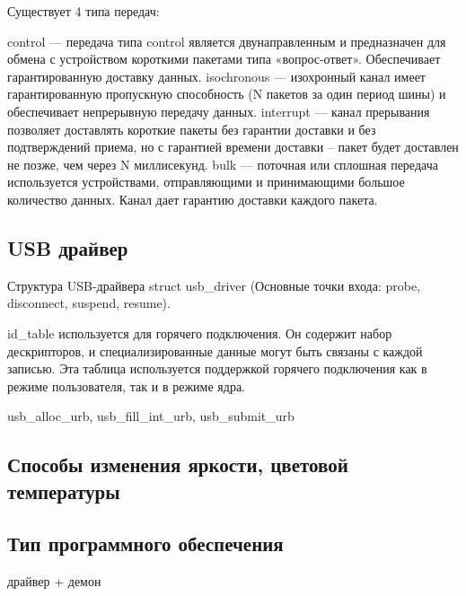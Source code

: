 Существует 4 типа передач:

control — передача типа control является двунаправленным и предназначен для обмена с устройством короткими пакетами типа «вопрос-ответ». Обеспечивает гарантированную доставку данных.
isochronous — изохронный канал имеет гарантированную пропускную способность (N пакетов за один период шины) и обеспечивает непрерывную передачу данных.
interrupt — канал прерывания позволяет доставлять короткие пакеты без гарантии доставки и без подтверждений приема, но с гарантией времени доставки – пакет будет доставлен не позже, чем через N миллисекунд.
bulk — поточная или сплошная передача используется устройствами, отправляющими и принимающими большое количество данных. Канал дает гарантию доставки каждого пакета.

\subsection{USB драйвер}


Структура USB-драйвера struct usb\_driver (Основные точки входа: probe, disconnect, suspend, resume).


id\_table используется для горячего подключения. Он содержит набор дескрипторов, и специализированные данные могут быть связаны с каждой записью. Эта таблица используется поддержкой горячего подключения как в режиме пользователя, так и в режиме ядра.


usb\_alloc\_urb, usb\_fill\_int\_urb, usb\_submit\_urb

\subsection{Способы изменения яркости, цветовой температуры}



\subsection{Тип программного обеспечения}

драйвер + демон